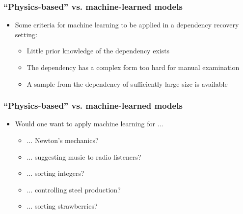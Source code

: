 \documentclass[usenames,dvipsnames,aspectratio=169]{beamer}
\begin{document}




\begin{frame}
\frametitle{``Physics-based'' vs. machine-learned models}

\begin{itemize}

    \item Some criteria for machine learning to be applied in a dependency recovery setting:
    \begin{itemize}
        \pause
        \item Little prior knowledge of the dependency exists
        \pause
        \item The dependency has a complex form too hard for manual examination
        \pause
        \item A sample from the dependency of sufficiently large size is available
    \end{itemize}

\end{itemize}

\end{frame}



\begin{frame}
\frametitle{``Physics-based'' vs. machine-learned models}

\begin{itemize}

    \item Would one want to apply machine learning for $\ldots$
    \begin{itemize}
        \pause 
        \item $\ldots$ Newton’s mechanics?
        \pause
        \item $\ldots$ suggesting music to radio listeners?
        \pause
        \item $\ldots$ sorting integers?
        \pause
        \item $\ldots$ controlling steel production?
        \pause
        \item $\ldots$ sorting strawberries?
    \end{itemize}

\end{itemize}

\end{frame}
\end{document}
